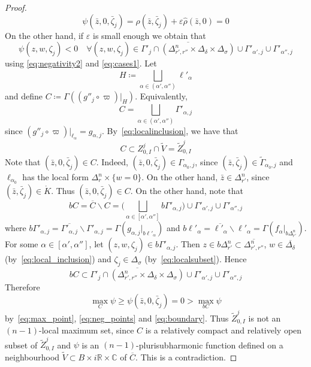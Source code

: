 \documentclass[reqno,oneside]{amsart}
\newcommand{\numberset}{\mathbb}
\newcommand{\R}{\numberset{R}}
\newcommand{\C}{\numberset{C}}
\renewcommand{\epsilon}{\varepsilon}
\theoremstyle{definition}
\theoremstyle{plain}
\theoremstyle{remark}
\begin{document}
\begin{proof}
    \begin{equation}
    \label{eq:max_point}
        \psi(\bar{z},0,\bar\zeta_j)=\rho(\bar{z},\bar\zeta_j)+\epsilon\hat\rho(\bar{z},0)=0
    \end{equation}
    On the other hand, if $\epsilon$ is small enough we obtain that
    \begin{equation}
    \label{eq:neg_points}
        \psi(z,w,\zeta_j)<0 \quad \forall(z,w,\zeta_j)\in\overline{\Gamma'_j\cap(\Delta_{r',r''}^n\times\Delta_\delta\times\Delta_\sigma)}\cup\Gamma'_{\alpha',j}\cup\Gamma'_{\alpha'',j}
    \end{equation}
    using \eqref{eq:negativity2} and \eqref{eq:cases1}. Let
    \[
        H\coloneqq\bigsqcup_{\alpha\in(\alpha',\alpha'')} \ell'_\alpha
    \]
    and define $C\coloneqq\Gamma((g''_j\circ\varpi)|_H)$. Equivalently,
    \[
        C=\bigsqcup_{\alpha\in(\alpha',\alpha'')} \Gamma'_{\alpha,j}
    \]
    since $(g''_j\circ\varpi)|_{\ell_\alpha}=g_{\alpha,j}$. By~\eqref{eq:localinclusion}, we have that
    \[
        C\subset Z_{0,I}^j\cap\tilde{V}=\tilde{Z}_{0,I}^j
    \]
    Note that $(\bar{z},0,\bar\zeta_j)\in C$. Indeed, $(\bar{z},0,\bar\zeta_j)\in\Gamma_{\alpha_0,j}$, since $(\bar{z},\bar\zeta_j)\in\tilde\Gamma_{\alpha_0,j}$ and $\ell_{\alpha_0}$ has the local form $\Delta_r^n\times\{w=0\}$. On the other hand, $\bar{z}\in\Delta_{r'}^n$, since $(\bar{z},\bar\zeta_j)\in\mathring{K}$. Thus $(\bar{z},0,\bar\zeta_j)\in C$. On the other hand, note that
    \[
        bC=\overline{C}\smallsetminus C=\biggl(\bigsqcup_{\alpha\in[\alpha',\alpha'']}b\Gamma'_{\alpha,j}\biggr)\cup\Gamma'_{\alpha',j}\cup\Gamma'_{\alpha'',j}
    \]
    where $b\Gamma'_{\alpha,j}=\overline{\Gamma'_{\alpha,j}}\smallsetminus\Gamma'_{\alpha,j}=\Gamma(g_{\alpha,j}|_{b\ell'_\alpha})$ and $b\ell'_\alpha=\overline{\ell'_\alpha}\smallsetminus\ell'_\alpha=\Gamma(f_\alpha|_{b\Delta_{r'}^n})$. For some $\alpha\in[\alpha',\alpha'']$, let $(z,w,\zeta_j)\in b\Gamma'_{\alpha,j}$. Then $z\in b\Delta^n_{r'}\subset\overline{\Delta^n_{r',r''}}$, $w\in\overline{\Delta_\delta}$ (by~\eqref{eq:local_inclusion}) and $\zeta_j\in\Delta_\sigma$ (by~\eqref{eq:localsubset}).
    Hence
    \begin{equation}
    \label{eq:boundary}
        bC\subset\overline{\Gamma'_j\cap(\Delta_{r',r''}^n\times\Delta_\delta\times\Delta_\sigma)}\cup\Gamma'_{\alpha',j}\cup\Gamma'_{\alpha'',j}
    \end{equation}
    Therefore
    \[
        \max_{C}\psi\geq\psi(\bar{z},0,\bar\zeta_j)=0>\max_{bC}\psi
    \]
    by~\eqref{eq:max_point}, \eqref{eq:neg_points} and \eqref{eq:boundary}. Thus $\tilde{Z}_{0,I}^j$ is not an $(n-1)$-local maximum set, since $C$ is a relatively compact and relatively open subset of $\tilde{Z}^j_{0,I}$ and $\psi$ is an $(n-1)$-plurisubharmonic function defined on a neighbourhood $\tilde{V}\subset B\times i\R\times\C$ of $\overline{C}$. This is a contradiction.


\end{proof}
\end{document}
